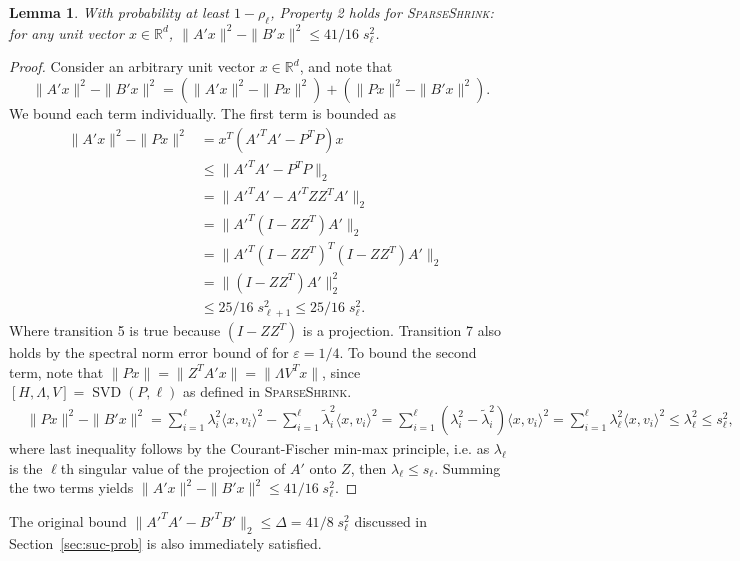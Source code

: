 \documentclass[11pt]{article}
\newcommand{\R}{\mathbb{R}}
\newcommand{\svd}{\operatorname{SVD}}
\newcommand{\eps}{\varepsilon}
\newcommand{\SSh}{\textsc{SparseShrink}\xspace}
\newtheorem{lemma}{Lemma}[section]
\begin{document}
\begin{lemma}
With probability at least $1-\rho_\ell$, Property 2 holds for \SSh: for any unit vector $x\in\R^d$, $\|A'x\|^2 - \|B'x\|^2 \leq 41/16 \; s_\ell^2$. \label{fact1}
\end{lemma}
\begin{proof}
Consider an arbitrary unit vector $x \in \R^d$, and note that
\[
\|A' x\|^2 - \|B' x\|^2 = \left( \|A' x\|^2 - \|P x\|^2  \right) + \left(\|P x\|^2 - \|B' x\|^2 \right).
\]
We bound each term individually.  The first term is bounded as
\begin{align}
\|A' x\|^2 - \|P x\|^2 &= x^T (A'^TA' - P^TP) x &\\
&\leq \|A'^TA' - P^TP\|_2  &\\
&= \|A'^TA' - A'^TZ Z^TA'\|_2 &\\
&= \|A'^T ( I-ZZ^T) A'\|_2 &\\
&= \|A'^T (I-ZZ^T)^T ( I-ZZ^T) A'\|_2 \\
&= \|( I-ZZ^T) A'\|_2^2 &\\
&\leq 25/16\; s_{\ell+1}^2 \leq 25/16\; s_\ell^2.  
\end{align} 
Where transition 5 is true because $(I-ZZ^T)$ is a projection. Transition 7 also holds by the spectral norm error bound of \cite{musco2015stronger} for $\eps=1/4$.
To bound the second term, note that $\|Px\| = \|Z^TA' x\| = \|\Lambda V^T x\|$, since $[H,\Lambda, V] = \svd(P,\ell)$ as defined in \SSh. 
\begin{align*}
&\|P x\|^2 - \|B' x\|^2 = \sum_{i=1}^\ell \lambda_i^2 \langle x,v_i\rangle^2 - \sum_{i=1}^\ell \tilde \lambda_i^2 \langle x,v_i\rangle^2=
\sum_{i=1}^\ell ( \lambda_i^2 - \tilde \lambda_i^2) \langle x,v_i\rangle^2 = \sum_{i=1}^\ell \lambda_\ell^2 \langle x,v_i\rangle^2 \leq \lambda_\ell^2 \leq s_\ell^2,
\end{align*}
where last inequality follows by the Courant-Fischer min-max principle, i.e. as $\lambda_\ell$ is the $\ell$th singular value of the projection of $A'$ onto $Z$, then $\lambda_\ell \leq s_\ell$. Summing the two terms yields $\|A'x\|^2 - \|B'x\|^2 \leq 41/16\; s_\ell^2$.
\end{proof}

The original bound $\|A'^TA' - B'^TB'\|_2 \leq \Delta = 41/8\; s_\ell^2$ discussed in Section~\ref{sec:suc-prob} is also immediately satisfied.
\end{document}
